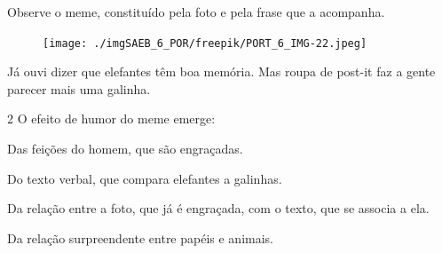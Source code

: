 


Observe o meme, constituído pela foto e pela frase que a
acompanha.

\begin{myquote}
\begin{figure}[H]
\centering\texttt{[image: ./imgSAEB\_6\_POR/freepik/PORT\_6\_IMG-22.jpeg]}
\end{figure}

Já ouvi dizer que elefantes têm boa memória. Mas roupa de post-it faz a
gente parecer mais uma galinha.
\end{myquote}

\num{2} O efeito de humor do meme emerge:

\begin{escolha}
\item Das feições do homem, que são engraçadas.
\item Do texto verbal, que compara elefantes a galinhas.
\item Da relação entre a foto, que já é engraçada, com o texto, que se
associa a ela. \item Da relação surpreendente entre papéis e animais.
\end{escolha}


